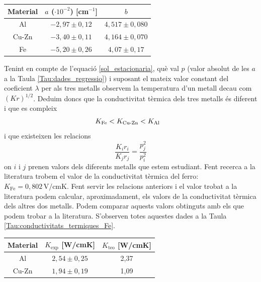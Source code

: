 \documentclass[12pt,twosides,onecolumn,openany]{article}
\newenvironment{Figura}
  {\par\medskip\noindent\minipage{\linewidth}}
  {\endminipage\par\medskip}
\begin{document}
\begin{multicols}{2}
\begin{Figura}
  \centering
  \begin{tabular}{c|c|c}
    Material & $a$ ($\cdot 10^{-2}$) [cm$^{-1}$] & $b$\\
    \hline\hline
    Al & $-2,97\pm0,12$ & $4,517\pm0,080$\\
    Cu-Zn & $-3,40\pm0,11$ & $4,164\pm0,070$ \\
    Fe & $-5,20\pm0,26$ & $4,07\pm0,17$
  \end{tabular}
  \label{Tau:dades_regressio}
\end{Figura}
Tenint en compte de l'equació \eqref{sol_estacionaria}, què val $p$ (valor absolut de les $a$ a la Taula \ref{Tau:dades_regressio}) i suposant el mateix valor constant del coeficient $\lambda$ per als tres metalls observem la temperatura d'un metall decau com $(Kr)^{1/2}$. Deduim doncs que la conductivitat tèrmica dels tres metalls és diferent i que es compleix
\begin{equation*}
  K_{\text{Fe}} < K_{\text{Cu-Zn}} < K_{\text{Al}} \hspace{3mm}
\end{equation*}
i que existeixen les relacions
\begin{equation*}
  \frac{K_ir_i}{K_jr_j} = \frac{p^2_j}{p^2_i}
\end{equation*}
on $i$ i $j$ prenen valors dels diferents metalls que estem estudiant. Fent recerca a la literatura trobem el valor de la conductivitat tèrmica del ferro: \(K_{\text{Fe}} =  0,802\, \text{V}/\text{cmK}\). Fent servir les relacions anteriors i el valor trobat a la literatura podem calcular, aproximadament, els valors de la conductivitat tèrmica dels altres dos metalls. Podem comparar aquests valors obtinguts amb els que podem trobar a la literatura. S'observen totes aquestes dades a la Taula \ref{Tau:conductivitats_termiques_Fe}.
\begin{Figura}
  \centering
  \begin{tabular}{c|c|c}
    Material & $K_{\text{exp}}$ [W/cmK] & $K_{\text{teo}}$ [W/cmK]\\
    \hline\hline
    Al & $2,54\pm0,25$ & 2,37\\
    Cu-Zn & $1,94\pm0,19$ & 1,09
  \end{tabular}

\end{Figura}
\end{multicols}
\end{document}
